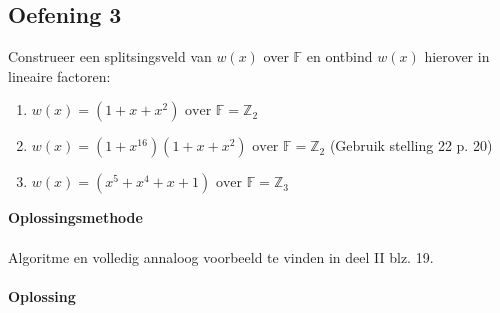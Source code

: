 \documentclass[11pt,a4paper,titlepage]{article}
\begin{document}
\subsection{Oefening 3}
Construeer een splitsingsveld van $w(x)$ over $\mathbb{F}$ en ontbind $w(x)$ hierover in lineaire factoren:
\begin{enumerate}[label=(\alph*)]
	\item $w(x) = (1 + x + x^2) \text{ over } \mathbb{F} = \mathbb{Z}_2$
	\item $w(x) = (1 + x^{16})(1 + x + x^2) \text{ over } \mathbb{F} = \mathbb{Z}_2$ (Gebruik stelling 22 p. 20)
	\item $w(x) = (x^5 + x^4 + x + 1) \text{ over } \mathbb{F} = \mathbb{Z}_3$
\end{enumerate}
\textbf{Oplossingsmethode} \\ \\
Algoritme en volledig annaloog voorbeeld te vinden in deel II blz. 19.
\\ \\ \textbf{Oplossing}
\end{document}
